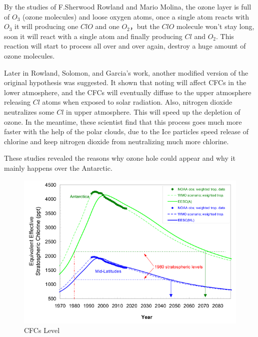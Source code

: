 \documentclass[12pt]{article}
\begin{document}
By the studies of F.Sherwood Rowland and Mario Molina, the ozone layer is full of $O_3$ (ozone molecules) and loose oxygen atoms, once a single atom reacts with $O_3$ it will producing one $ClO$ and one $O_2$，but the $ClO$ molecule won't stay long, soon it will react with a single atom and finally producing $Cl$ and $O_2$. This reaction will start to process all over and over again, destroy a huge amount of ozone molecules.%

Later in Rowland, Solomon, and Garcia’s work, another modified version of the original hypothesis was suggested. It shown that noting will affect CFCs in the lower atmosphere, and  the CFCs will eventually diffuse to the upper atmosphere releasing $Cl$ atoms when exposed to solar radiation. Also, nitrogen dioxide neutralizes some $Cl$ in upper atmosphere. This will speed up the depletion of ozone. In the meantime, these scientist find that this process  goes much more faster with the help of the polar clouds, due to the Ice particles speed release of chlorine and keep nitrogen dioxide from neutralizing much more chlorine.

These studies revealed the reasons why ozone hole could appear and why it mainly happens over the Antarctic.

\begin{center}
\begin{figure}[htpb]
\centering
\includegraphics[scale=0.8]{cfc}
\caption{CFCs Level\cite{ncep.noaa.gov}}\label{fig:CFCs Level}
\end{figure}
\end{center}
\cite{ncep.noaa.gov}
\end{document}
